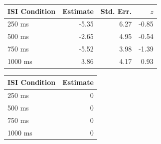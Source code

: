 \documentclass[A4paper,man,floatsintext]{apa6}
\theoremstyle{definition}
\theoremstyle{definition}
\theoremstyle{definition}
\theoremstyle{remark}
\begin{document}
\begin{appendix}
\begin{table}[!p]
\begin{subtable}{\textwidth}
\begin{table}[H]
\begin{tabular}{lrrr}
\toprule
ISI Condition & Estimate & Std. Err. & $z$\\
\midrule
250  ms & -5.35 & 6.27 & -0.85\\
500  ms & -2.65 & 4.95 & -0.54\\
750  ms & -5.52 & 3.98 & -1.39\\
1000 ms & 3.86 & 4.17 & 0.93\\
\bottomrule
\end{tabular}\endgroup{}
\end{table}
\end{subtable}
\begin{subtable}{\textwidth}
\caption{Variance Component Estimates. Estimates are presented on the standard deviation scale. }
\centering
\begin{table}[H]\centering\begingroup\fontsize{10}{12}\selectfont

\begin{tabular}{lr}
\toprule
ISI Condition & Estimate\\
\midrule
250 ms & 0\\
500 ms & 0\\
750 ms & 0\\
1000 ms & 0\\
\bottomrule
\end{tabular}\endgroup{}
\end{table}
\end{subtable}
\end{table}
\end{appendix}
\end{document}
